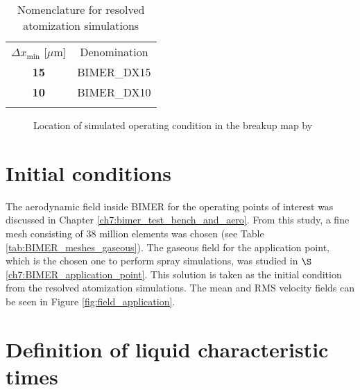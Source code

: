 \begin{table}[!h]
\centering
\caption{Nomenclature for resolved atomization simulations}
\begin{tabular}{cc}
\thickhline
$\Delta x_\mathrm{min}$ [$\mu$m]  &  Denomination \\ 
\thickhline
\textbf{15} & BIMER\_DX15 \\
\textbf{10} & BIMER\_DX10 \\
\thickhline
\end{tabular}
\label{tab:BIMER_resolved_simulations_performed}
\end{table}


\clearpage

\begin{figure}[ht]
     \centering
     \vspace*{-0.2in}
     \caption{Location of simulated operating condition in the breakup map by \citeColor[wu_breakup_1997]}
      \label{fig:location_BIMER_op_in_breakup_map}
\end{figure}



\section{Initial conditions}

The aerodynamic field inside BIMER for the operating points of interest was discussed in Chapter \ref{ch7:bimer_test_bench_and_aero}. From this study, a fine mesh consisting of 38 million elements was chosen (see Table \ref{tab:BIMER_meshes_gaseous}). The gaseous field for the application point, which is the chosen one to perform spray simulations, was studied in $\S$\ref{ch7:BIMER_application_point}. This solution is taken as the initial condition from the resolved atomization simulations. The mean and RMS velocity fields can be seen in Figure \ref{fig:field_application}. 


\section{Definition of liquid characteristic times}

